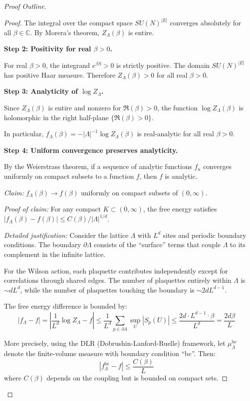 \begin{proof}[Proof Outline]
\begin{proof}
The integral over the compact space $SU(N)^{|E|}$ converges absolutely for all $\beta \in \mathbb{C}$. 
By Morera's theorem, $Z_\Lambda(\beta)$ is entire.

\textbf{Step 2: Positivity for real $\beta > 0$.}

For real $\beta > 0$, the integrand $e^{\beta S} > 0$ is strictly positive. 
The domain $SU(N)^{|E|}$ has positive Haar measure. Therefore $Z_\Lambda(\beta) > 0$ 
for all real $\beta > 0$.

\textbf{Step 3: Analyticity of $\log Z_\Lambda$.}

Since $Z_\Lambda(\beta)$ is entire and nonzero for $\Re(\beta) > 0$, the function 
$\log Z_\Lambda(\beta)$ is holomorphic in the right half-plane $\{\Re(\beta) > 0\}$.

In particular, $f_\Lambda(\beta) = -|\Lambda|^{-1} \log Z_\Lambda(\beta)$ is real-analytic 
for all real $\beta > 0$.

\textbf{Step 4: Uniform convergence preserves analyticity.}

By the Weierstrass theorem, if a sequence of analytic functions $f_n$ converges 
uniformly on compact subsets to a function $f$, then $f$ is analytic.

\textit{Claim:} $f_\Lambda(\beta) \to f(\beta)$ uniformly on compact subsets of $(0, \infty)$.

\textit{Proof of claim:} For any compact $K \subset (0, \infty)$, the free energy 
satisfies $|f_\Lambda(\beta) - f(\beta)| \leq C(\beta)/|\Lambda|^{1/d}$.

\textit{Detailed justification:} Consider the lattice $\Lambda$ with $L^d$ sites 
and periodic boundary conditions. The boundary $\partial\Lambda$ consists of the 
``surface'' terms that couple $\Lambda$ to its complement in the infinite lattice.

For the Wilson action, each plaquette contributes independently except for 
correlations through shared edges. The number of plaquettes entirely within 
$\Lambda$ is $\sim dL^d$, while the number of plaquettes touching the boundary 
is $\sim 2dL^{d-1}$.

The free energy difference is bounded by:
\[
|f_\Lambda - f| = \left|\frac{1}{L^d}\log Z_\Lambda - f\right| 
\leq \frac{1}{L^d} \sum_{p \in \partial\Lambda} \sup_U |S_p(U)| 
\leq \frac{2d \cdot L^{d-1} \cdot \beta}{L^d} = \frac{2d\beta}{L}
\]

More precisely, using the DLR (Dobrushin-Lanford-Ruelle) framework, let 
$\mu_\Lambda^{\text{bc}}$ denote the finite-volume measure with boundary 
condition ``bc''. Then:
\[
|f_\Lambda^{\text{bc}} - f| \leq \frac{C(\beta)}{L}
\]
where $C(\beta)$ depends on the coupling but is bounded on compact sets.


\end{proof}
\end{proof}
